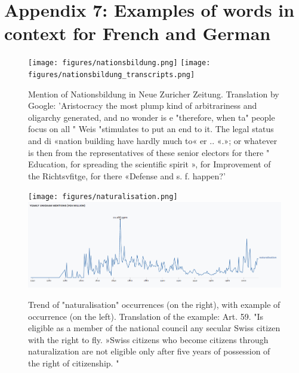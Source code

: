 \documentclass[11pt]{article}
\begin{document}
\newpage

\section*{Appendix 7: Examples of words in context for French and German}

\begin{figure}[H]     
\centering
    \mbox{\texttt{[image: figures/nationsbildung.png]}}
    \mbox{\texttt{[image: figures/nationsbildung\_transcripts.png]}}
    \caption{Mention of Nationsbildung in Neue Zuricher Zeitung. Translation by Google: 'Aristocracy the most plump kind of arbitrariness and oligarchy generated, and no wonder is e "therefore, when ta" people focus on all " Weis "stimulates to put an end to it. The legal status and di «nation building have hardly much to« er .. «.»; or whatever is then from the representatives of these senior electors for there "  Education, for spreading the scientific spirit », for Improvement of the Richtsvfitge, for there «Defense and s. f. happen?'}
    \label{fig:nationsbildung}
\end{figure}

\begin{figure}[H]
\centering
    \mbox{\texttt{[image: figures/naturalisation.png]}}
    \mbox{\includegraphics[scale=0.4]{figures/naturalisation_trend.png}}
    \caption{Trend of "naturalisation" occurrences (on the right), with example of occurrence (on the left). Translation of the example: Art. 59. "Is eligible as a member of the national council any secular Swiss citizen with the right to fly. »Swiss citizens who become citizens through naturalization are not eligible only after five years of possession of the right of citizenship. "}
    \label{fig:naturalisation}
\end{figure}
\end{document}

